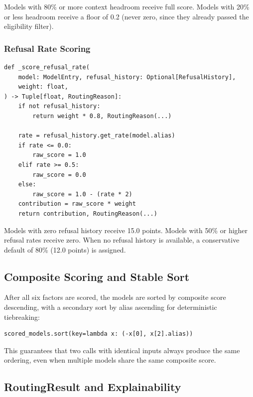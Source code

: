 \documentclass[11pt,a4paper]{article}
\theoremstyle{plain}
\theoremstyle{definition}
\begin{document}
Models with 80\% or more context headroom receive full score. Models with 20\%
or less headroom receive a floor of 0.2 (never zero, since they already passed
the eligibility filter).

\subsubsection{Refusal Rate Scoring}

\begin{lstlisting}[style=pythonstyle, caption={Refusal rate scoring from \texttt{routing.py}}]
def _score_refusal_rate(
    model: ModelEntry, refusal_history: Optional[RefusalHistory],
    weight: float,
) -> Tuple[float, RoutingReason]:
    if not refusal_history:
        return weight * 0.8, RoutingReason(...)

    rate = refusal_history.get_rate(model.alias)
    if rate <= 0.0:
        raw_score = 1.0
    elif rate >= 0.5:
        raw_score = 0.0
    else:
        raw_score = 1.0 - (rate * 2)
    contribution = raw_score * weight
    return contribution, RoutingReason(...)
\end{lstlisting}

Models with zero refusal history receive 15.0 points. Models with 50\% or
higher refusal rates receive zero. When no refusal history is available, a
conservative default of 80\% (12.0 points) is assigned.

\subsection{Composite Scoring and Stable Sort}

After all six factors are scored, the models are sorted by composite score
descending, with a secondary sort by alias ascending for deterministic
tiebreaking:

\begin{lstlisting}[style=pythonstyle, caption={Composite scoring and stable sort from \texttt{routing.py}}]
scored_models.sort(key=lambda x: (-x[0], x[2].alias))
\end{lstlisting}

This guarantees that two calls with identical inputs always produce the same
ordering, even when multiple models share the same composite score.

\subsection{RoutingResult and Explainability}
\end{document}
